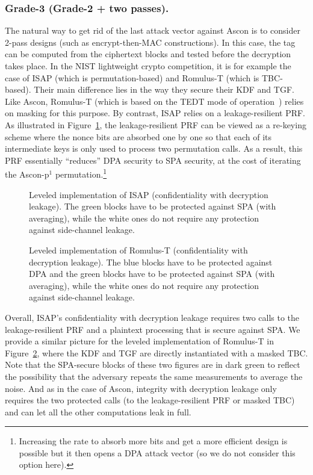 \documentclass{llncs}
\begin{document}
\subsubsection{Grade-3 (Grade-2 + two passes).}
The natural way to get rid of the last attack vector against Ascon
is to consider 2-pass designs (such as encrypt-then-MAC constructions).
In this case, the tag can be computed
from the ciphertext blocks and tested before the decryption takes place. 
 In the NIST lightweight
crypto competition, it is for example the case of 
ISAP (which is permutation-based) and Romulus-T (which is TBC-based). 
Their main difference lies in the way they secure their KDF and TGF.
Like Ascon,
Romulus-T (which is based on the TEDT mode of operation~\cite{DBLP:journals/tches/BertiGPPS20})
relies on masking for this purpose. By contrast, ISAP relies on 
a leakage-resilient PRF. As illustrated in Figure~\ref{fig:ISAP}, the leakage-resilient PRF
can be viewed as a re-keying scheme where the nonce bits are absorbed one 
by one so that each of its intermediate keys is only used to process two 
permutation calls. As a result, this PRF essentially ``reduces'' DPA security to SPA 
security, at the cost of iterating the Ascon-p$^1$ permutation.\footnote{Increasing the rate 
to absorb more bits and get a more efficient design is possible but it then opens
a DPA attack vector (so we do not consider this option here).}

\begin{figure}
    \centering
    
	\caption{
            Leveled implementation of ISAP (confidentiality with decryption leakage).
            The green blocks have to be protected against SPA (with averaging), while the white
            ones do not require any protection against side-channel leakage.
        }\label{fig:ISAP}
\end{figure}

\begin{figure}
    \centering
    
    \caption{Leveled implementation of Romulus-T (confidentiality with decryption leakage).
            The blue blocks have to be protected against DPA and the green blocks
            have to be protected against SPA (with averaging), while the white ones do not require any
            protection against side-channel leakage.
    }
    \label{fig:TEDT}
\end{figure}

Overall, ISAP's confidentiality with decryption leakage requires two calls to the
leakage-resilient PRF and a plaintext processing that is secure against SPA.
We provide a similar picture for the leveled implementation
of Romulus-T in Figure~\ref{fig:TEDT}, where the KDF and TGF
are directly instantiated with a masked TBC. 
Note that the SPA-secure blocks of these two figures are in dark green to reflect the possibility
that the adversary repeats the same measurements to average the noise.
And as in the case of Ascon,
integrity with decryption leakage only requires the two protected calls (to 
the leakage-resilient PRF or masked TBC) and can let all the other computations leak in full.
\end{document}
